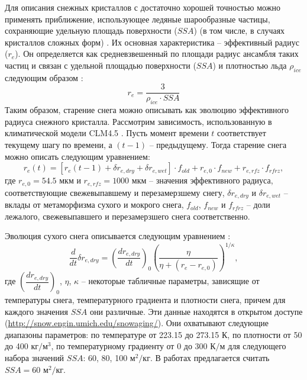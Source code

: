 \documentclass[a4paper, fontsize=14pt]{scrartcl}
\begin{document}
\newpage
Для описания снежных кристаллов с достаточно хорошей точностью можно применять приближение, использующее ледяные шарообразные частицы, сохраняющие удельную площадь поверхности ($SSA$) (в том числе, в случаях кристаллов сложных форм) \cite{Grenfell1999}. Их основная характеристика -- эффективный радиус ($r_e$). Он определяется как средневзвешенный по площади радиус ансамбля таких частиц и связан с удельной площадью поверхности ($SSA$) и плотностью льда $\rho_{ice}$ следующим образом \cite{Flanner2006}:  
\begin{equation}
    r_e = \dfrac{3} {\rho_{ice} \cdot SSA} \label{sys}
\end{equation}
Таким образом, старение снега можно описывать как эволюцию эффективного радиуса снежного кристалла. Рассмотрим зависимость, использованную в климатической модели CLM4.5 \cite{CLM4.5tech}. Пусть момент времени $t$ соответствует текущему шагу по времени, а $(t - 1)$ -- предыдущему. Тогда старение снега можно описать следующим уравнением:
\begin{equation}
    r_e(t) = [r_e (t - 1) + \delta r_{e , dry} + \delta r_{e , wet} ] \cdot f_{old} + r_{e ,0} \cdot f_{new} + r_{e , rfz} \cdot f_{rfrz}, \label{sysRDS1}
\end{equation}
где $ r_{e ,0} = 54.5 $ мкм и $r_{e , rfz} = 1000 $ мкм -- значения эффективного радиуса, соответствующие свежевыпавшему и перезамерзшему снегу, $\delta r_{e , dry}$ и $\delta r_{e , wet}$ -- вклады от метаморфизма сухого и мокрого снега, $f_{old}$, $f_{new}$ и $f_{rfrz}$ -- доли лежалого, свежевыпавшего и перезамерзшего снега соответственно.  

Эволюция сухого снега описывается следующим уравнением \cite{Flanner2006, Flanner2007, CLM4.5tech}:
\begin{equation}
    \dfrac{d}{dt} \delta r_{e , dry} = {\left( \dfrac{dr_{e , dry}}{dt} \right)}_0 \left(\dfrac{\eta}{\eta + (r_e - r_{e, 0})}\right)^{1 / \kappa}, \label{sys}
\end{equation}
где ${\left( \dfrac{dr_{e , dry}}{dt} \right)}_0$, $\eta$, $\kappa$ -- некоторые табличные параметры, зависящие от температуры снега, температурного градиента и плотности снега, причем для каждого значения $SSA$ они различные. Эти данные находятся в открытом доступе (\url{http://snow.engin.umich.edu/snowaging/}). Они охватывают следующие диапазоны параметров: по температуре от 223.15 до 273.15 К, по плотности от 50 до 400 кг$/$м$^3$, по температурному градиенту от 0 до 300 К$/$м для следующего набора значений $SSA$: 60, 80, 100 м$^2/$кг. В работах \cite{CLM4.5tech, Flanner2006, Flanner2007} предлагается считать $SSA = 60$ м$^2/$кг.
\end{document}
